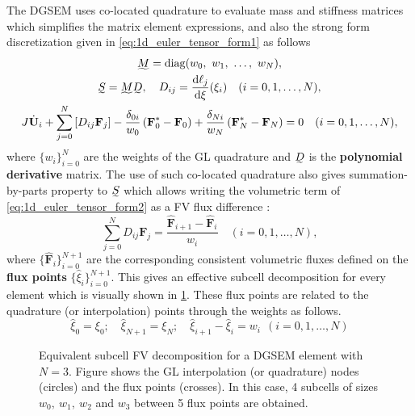 \documentclass[a4paper,11pt,oneside]{article}
\newcommand{\newword}[1]{\textbf{#1}} %
\newcommand{\vect}[1]{\ensuremath{\boldsymbol{\mathbf{#1}}}} %
\newcommand{\der}[2]{\frac{\sdd #1}{\sdd #2}}
\newcommand{\sdd}{\ensuremath{\text{d}}} %
\DeclareMathOperator{\diag}{diag} %
\newcommand{\linalgmat}[1]{\ensuremath{\undertilde{#1}}} %
\newcommand{\eulerref}[1]{\ensuremath{#1}} %
\begin{document}
The DGSEM uses co-located quadrature to evaluate mass and stiffness matrices which simplifies the matrix element expressions, and also the strong form discretization given in \cref{eq:1d_euler_tensor_form1} as follows
\begin{gather}
	\linalgmat{M} = \diag(w_0,\ w_1,\ \ldots,\ w_N),
	\label{eq:dgsem_mass_matrix} \nonumber\\
	\linalgmat{S} = \linalgmat{M} \linalgmat{D}, \quad D_{ij} = \der{\ell_j}{\xi}(\xi_i) \quad (i=0,1,\ldots,N),
	\label{eq:dgsem_polynomial_derivative_matrix} \nonumber\\
	J \dot{\vect{\eulerref{U}}}_i + \sum_{j=0}^{N} \left[ D_{ij} \vect{\eulerref{F}}_j \right] - \frac{\delta_{0i}}{w_0} \left( \vect{\eulerref{F}}^*_0 - \vect{\eulerref{F}}_0 \right) + \frac{\delta_{Ni}}{w_N} \left( \vect{\eulerref{F}}^*_N - \vect{\eulerref{F}}_N \right) = 0 \quad (i=0,1,\ldots,N),
	\label{eq:1d_euler_tensor_form2}
\end{gather}
where $\{w_i\}_{i=0}^{N}$ are the weights of the GL quadrature and $\linalgmat{D}$ is the \newword{polynomial derivative} matrix. The use of such co-located quadrature also gives summation-by-parts property to $\linalgmat{S}$ which allows writing the volumetric term of \cref{eq:1d_euler_tensor_form2} as a FV flux difference \cite{fisherCarpenterNordstrom2013}:
\begin{equation}
	\sum_{j=0}^{N} D_{ij} \vect{\eulerref{F}}_j = \frac{\hat{\vect{\eulerref{F}}}_{i+1} - \hat{\vect{\eulerref{F}}}_i}{w_i} \quad (i=0,1,\ldots,N),
	\label{eq:telescopic_form}
\end{equation}
where $\{\hat{\vect{\eulerref{F}}}_i\}_{i=0}^{N+1}$ are the corresponding consistent volumetric fluxes defined on the \newword{flux points} $\{\hat{\xi}_i\}_{i=0}^{N+1}$. This gives an effective subcell decomposition for every element which is visually shown in \cref{fig:dgsem_subcell_fc_equivalence}. These flux points are related to the quadrature (or interpolation) points through the weights as follows.
\begin{equation*}
	\hat{\xi}_0 = \xi_0; \quad \hat{\xi}_{N+1} = \xi_N;\quad
	\hat{\xi}_{i+1} - \hat{\xi}_i = w_i\ \  (i=0,1,\ldots,N)
	\label{eq:flux_points}
\end{equation*}
\begin{figure}[htbp]
	\centering
	
	\caption{Equivalent subcell FV decomposition for a DGSEM element with $N=3$. Figure shows the GL interpolation (or quadrature) nodes (circles) and the flux points (crosses). In this case, 4 subcells of sizes $w_0,\ w_1,\ w_2$ and $w_3$ between 5 flux points are obtained.}
	\label{fig:dgsem_subcell_fc_equivalence}
\end{figure}
\end{document}
